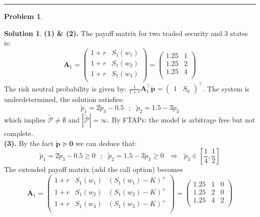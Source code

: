 \documentclass[a4paper, 10pt]{article}
\theoremstyle{definition}
\newtheorem{problem}{Problem}
\theoremstyle{hSol}
\newtheorem*{solution}{Solution}
\begin{document}
\noindent\rule{16cm}{0.4pt}
\begin{problem} 
\end{problem}
\begin{solution} \textbf{(1) \& (2).} The payoff matrix for two traded security and 3 states is:
$$
\bm{A}_1 = \begin{pmatrix}
	1+r & S_1(w_1) \\[2pt]
	1+r & S_1(w_2) \\[2pt]
	1+r & S_1(w_3) \\[2pt]
\end{pmatrix} = 
\begin{pmatrix}
	1.25 & 1 \\[2pt]
	1.25 & 2 \\[2pt]
	1.25 & 4 \\[2pt]
\end{pmatrix}
$$
The risk neutral probability is given by: $\frac{1}{1+r}\bm{A}_1^{\top} \tilde{\bm{p}} = \begin{pmatrix}1 & S_0\end{pmatrix}^{\top}$. The system is underdetermined, the solution satisfies: 
\begin{equation}
	\tilde{p}_1=2\tilde{p}_3-0.5 ~~~;~~~ \tilde{p}_2 = 1.5 - 3\tilde{p}_3
\end{equation}
which implies $\tilde{\mathcal{P}} \ne \emptyset$ and $|\tilde{\mathcal{P}}| = \infty$. By FTAPs: the model is arbitrage free but not complete. \\
\textbf{(3).} By the fact $\tilde{\bm{p}}\succeq \bm{0}$ we can deduce that:
\begin{equation}
	\tilde{p}_1=2\tilde{p}_3-0.5 \geq 0 ~~~;~~~ \tilde{p}_2 = 1.5 - 3\tilde{p}_3 \geq 0~~~ \Rightarrow ~~~ \tilde{p}_3 \in \left[\frac{1}{4}, \frac{1}{2}\right]
\end{equation}
The extended payoff matrix (add the call option) becomes
$$
\overline{\bm{A}}_1 = \begin{pmatrix}
	1+r & S_1(w_1) & (S_1(w_1)-K)^{+}\\[2pt]
	1+r & S_1(w_2) & (S_1(w_2)-K)^{+}\\[2pt]
	1+r & S_1(w_3) & (S_1(w_3)-K)^{+}\\[2pt]
\end{pmatrix} = 
\begin{pmatrix}
	1.25 & 1 & 0\\[2pt]
	1.25 & 2 & 0\\[2pt]
	1.25 & 4 & 2\\[2pt]

\end{pmatrix}$$
\end{solution}
\end{document}
